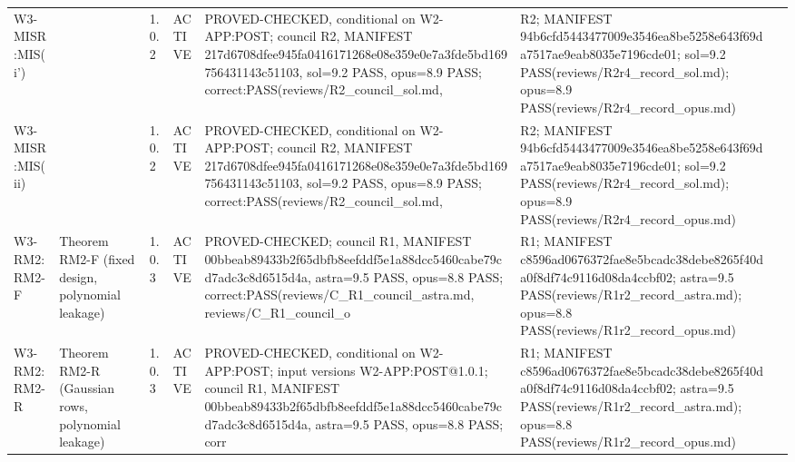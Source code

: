 \begin{longtable}{p{2.2cm}p{2.2cm}p{0.7cm}p{1.2cm}p{3.2cm}p{1.8cm}p{3cm}}
W3-MISR:MIS(i') &  & 1.0.2 & ACTIVE & PROVED-CHECKED, conditional on W2-APP:POST; council R2, MANIFEST 217d6708dfee945fa0416171268e08e359e0e7a3fde5bd169756431143c51103, sol=9.2 PASS, opus=8.9 PASS; correct:PASS(reviews/R2\_council\_sol.md,  & R2; MANIFEST 94b6cfd5443477009e3546ea8be5258e643f69da7517ae9eab8035e7196cde01; sol=9.2 PASS(reviews/R2r4\_record\_sol.md); opus=8.9 PASS(reviews/R2r4\_record\_opus.md) &  \\
W3-MISR:MIS(ii) &  & 1.0.2 & ACTIVE & PROVED-CHECKED, conditional on W2-APP:POST; council R2, MANIFEST 217d6708dfee945fa0416171268e08e359e0e7a3fde5bd169756431143c51103, sol=9.2 PASS, opus=8.9 PASS; correct:PASS(reviews/R2\_council\_sol.md,  & R2; MANIFEST 94b6cfd5443477009e3546ea8be5258e643f69da7517ae9eab8035e7196cde01; sol=9.2 PASS(reviews/R2r4\_record\_sol.md); opus=8.9 PASS(reviews/R2r4\_record\_opus.md) &  \\
W3-RM2:RM2-F & Theorem RM2-F (fixed design, polynomial leakage) & 1.0.3 & ACTIVE & PROVED-CHECKED; council R1, MANIFEST 00bbeab89433b2f65dbfb8eefddf5e1a88dcc5460cabe79cd7adc3c8d6515d4a, astra=9.5 PASS, opus=8.8 PASS; correct:PASS(reviews/C\_R1\_council\_astra.md, reviews/C\_R1\_council\_o & R1; MANIFEST c8596ad0676372fae8e5bcadc38debe8265f40da0f8df74c9116d08da4ccbf02; astra=9.5 PASS(reviews/R1r2\_record\_astra.md); opus=8.8 PASS(reviews/R1r2\_record\_opus.md) &  \\
W3-RM2:RM2-R & Theorem RM2-R (Gaussian rows, polynomial leakage) & 1.0.3 & ACTIVE & PROVED-CHECKED, conditional on W2-APP:POST; input versions W2-APP:POST@1.0.1; council R1, MANIFEST 00bbeab89433b2f65dbfb8eefddf5e1a88dcc5460cabe79cd7adc3c8d6515d4a, astra=9.5 PASS, opus=8.8 PASS; corr & R1; MANIFEST c8596ad0676372fae8e5bcadc38debe8265f40da0f8df74c9116d08da4ccbf02; astra=9.5 PASS(reviews/R1r2\_record\_astra.md); opus=8.8 PASS(reviews/R1r2\_record\_opus.md) &  \\
\end{longtable}
